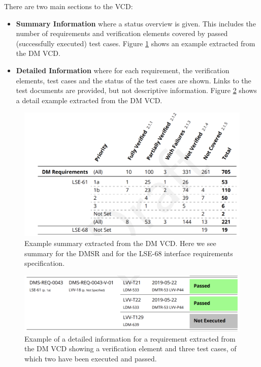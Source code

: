 There are two main sections to the VCD:

\begin{itemize}
\item \textbf{Summary Information} where a status overview is given.
This includes the number of requirements and verification elements covered by passed (successfully executed) test cases.
Figure \ref{fig:vcdsum} shows an example extracted from the DM VCD.
\item \textbf{Detailed Information} where for each requirement, the verification elements, test cases
and the status of the test cases are shown. Links to the test documents are provided, but not descriptive information.
Figure \ref{fig:vcddetail} shows a detail example extracted from the DM VCD.
\end{itemize}

\begin{figure}
\begin{center}
\includegraphics[width=\textwidth]{imgs/VCDsumm.png}
 \caption{Example summary extracted from the DM VCD. 
 Here we see summary for the DMSR \cite{LSE-61} and for the LSE-68 interface requirements specification\cite{LSE-68}.}
 \label{fig:vcdsum}
\end{center}
\end{figure}

\begin{figure}
\begin{center}
\includegraphics[width=\textwidth]{imgs/VCDdetail.png}
 \caption{Example of a detailed information for a requirement extracted from the DM VCD 
 showing a verification element and three test cases, of which two have been executed and passed.}
 \label{fig:vcddetail}
\end{center}
\end{figure}


